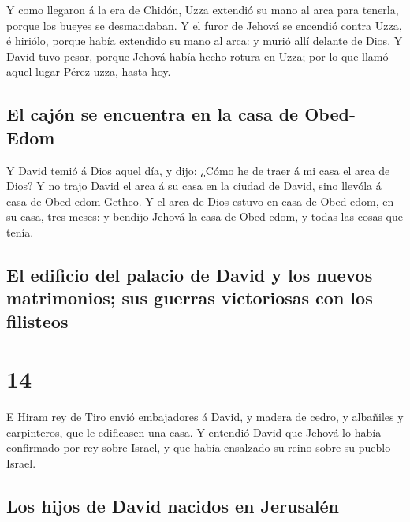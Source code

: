  Y como llegaron á la era de Chidón, Uzza extendió su mano
al arca para tenerla, porque los bueyes se desmandaban. 
Y el furor de Jehová se encendió contra Uzza, é hiriólo, porque había
extendido su mano al arca: y murió allí delante de Dios. 
Y David tuvo pesar, porque Jehová había hecho rotura en Uzza; por lo que
llamó aquel lugar Pérez-uzza, hasta hoy.

\hypertarget{el-cajuxf3n-se-encuentra-en-la-casa-de-obed-edom}{%
\subsection{El cajón se encuentra en la casa de
Obed-Edom}\label{el-cajuxf3n-se-encuentra-en-la-casa-de-obed-edom}}

 Y David temió á Dios aquel día, y dijo: ¿Cómo he de
traer á mi casa el arca de Dios?  Y no trajo David el
arca á su casa en la ciudad de David, sino llevóla á casa de Obed-edom
Getheo.  Y el arca de Dios estuvo en casa de Obed-edom,
en su casa, tres meses: y bendijo Jehová la casa de Obed-edom, y todas
las cosas que tenía.

\hypertarget{el-edificio-del-palacio-de-david-y-los-nuevos-matrimonios-sus-guerras-victoriosas-con-los-filisteos}{%
\subsection{El edificio del palacio de David y los nuevos matrimonios;
sus guerras victoriosas con los
filisteos}\label{el-edificio-del-palacio-de-david-y-los-nuevos-matrimonios-sus-guerras-victoriosas-con-los-filisteos}}

\hypertarget{section-13}{%
\section{14}\label{section-13}}

 E Hiram rey de Tiro envió embajadores á David, y madera
de cedro, y albañiles y carpinteros, que le edificasen una casa.
 Y entendió David que Jehová lo había confirmado por rey
sobre Israel, y que había ensalzado su reino sobre su pueblo Israel.

\hypertarget{los-hijos-de-david-nacidos-en-jerusaluxe9n}{%
\subsection{Los hijos de David nacidos en
Jerusalén}\label{los-hijos-de-david-nacidos-en-jerusaluxe9n}}

